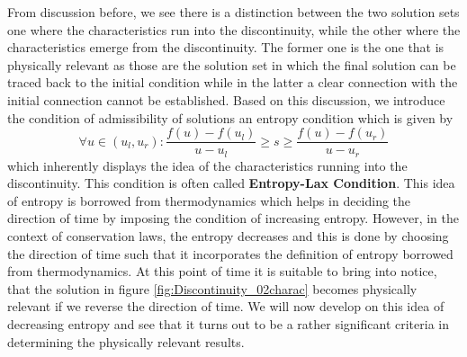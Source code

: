 \documentclass[11pt, a4paper]{report}
\begin{document}
From discussion before, we see there is a distinction between the two solution sets \textemdash one where the 
characteristics run into the discontinuity, while the other where the characteristics emerge from the discontinuity.
The former one is the one that is physically relevant as those are the solution set in which the final solution can 
be traced back to the initial condition while in the latter a clear connection with the initial connection cannot 
be established. Based on this discussion, we introduce the condition of admissibility of solutions \textemdash an 
entropy condition \textemdash which is given by
\begin{equation}
    \forall u \in \left(u_{l}, u_{r}\right):\frac{f(u) - f\left(u_{l}\right)}{u - u_{l}} \geq s \geq \frac{f(u) - f\left(u_{r}\right)}{u - u_{r}}
\end{equation}
which inherently displays the idea of the characteristics running into the discontinuity. This condition is often
called {\bfseries Entropy-Lax Condition}. This idea of entropy is borrowed from thermodynamics which helps in
deciding the direction of time by imposing the condition of increasing entropy. However, in the context of 
conservation laws, the entropy decreases and this is done by choosing the direction of time such that it incorporates
the definition of entropy borrowed from thermodynamics. At this point of time it is suitable to bring into notice,
that the solution in figure \ref{fig:Discontinuity_02charac} becomes physically relevant if we reverse the direction of
time. We will now develop on this idea of decreasing entropy and see that it turns out to be a rather significant 
criteria in determining the physically relevant results.
\end{document}

